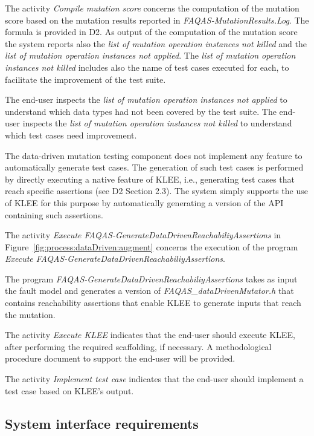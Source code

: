 \RQ{} The activity \emph{Compile mutation score} concerns the computation of the mutation score based on the mutation results reported in \emph{FAQAS-MutationResults.Log}. The formula is provided in D2. As output of the computation of the mutation score the system reports also the \emph{list of mutation operation instances not killed} and the \emph{list of mutation operation instances not applied}. The \emph{list of mutation operation instances not killed} includes also the name of test cases executed for each, to facilitate the improvement of the test suite.

\RQ{} The end-user inspects the \emph{list of mutation operation instances not applied} to understand which data types had not been covered by the test suite. The end-user inspects the \emph{list of mutation operation instances not killed} to understand which test cases need improvement.

\RQ{} The data-driven mutation testing component does not implement any feature to automatically generate test cases. The generation of such test cases is performed by directly executing a native feature of KLEE, i.e., generating test cases that reach specific assertions (see D2 Section 2.3). The system simply supports the use of KLEE for this purpose by automatically generating a version of the API containing such assertions. 

\RQ{} The activity \emph{Execute FAQAS-GenerateDataDrivenReachabiliyAssertions} in Figure~\ref{fig:process:dataDriven:augment} concerns the execution of the program \emph{Execute FAQAS-GenerateDataDrivenReachabiliyAssertions}.

\RQ{} The program \emph{FAQAS-GenerateDataDrivenReachabiliyAssertions} takes as input the fault model and generates a version of \emph{FAQAS\_dataDrivenMutator.h} that contains reachability assertions that enable KLEE to generate inputs that reach the mutation.

\RQ{} The activity \emph{Execute KLEE} indicates that the end-user should execute KLEE, after performing the required scaffolding, if necessary. A methodological procedure document to support the end-user will be provided.

\RQ{} The activity \emph{Implement test case} indicates that the end-user should implement a test case based on KLEE's output.

\subsection{System interface requirements}

